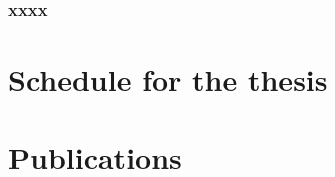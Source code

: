 \documentclass{article}
\begin{document}
\subsubsection{xxxx}





\section{Schedule for the thesis}





\section{Publications}



\newpage
{}
\end{document}
